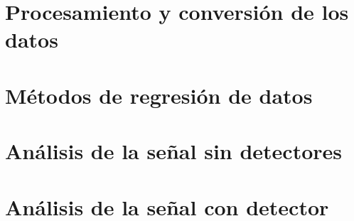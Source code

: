 \documentclass[12pt]{report}
\begin{document}
    \section{Procesamiento y conversión de los datos}
    
        
    \section{Métodos de regresión de datos}
    \label{Cap_regresion}
    
	\section{Análisis de la señal sin detectores}
	
	
	\section{Análisis de la señal con detector}
    
    
    
  

    




\end{document}
